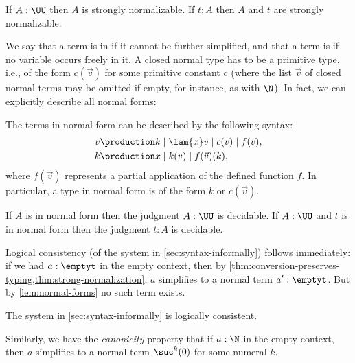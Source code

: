 \begin{thm}\label{thm:strong-normalization}
If $A : \UU$ then $A$ is strongly normalizable.
If $t:A$ then $A$ and $t$ are strongly normalizable.
\end{thm}

We say that a term is in 
%
%
if it cannot be further
simplified, and that a term is 
%
%
if no variable occurs freely in
it. A closed normal type has to be a primitive type, i.e., of the form
$c(\vec{v})$ for some primitive constant $c$ (where the list $\vec{v}$ of closed
normal terms may be omitted if empty, for instance, as with $\N$). In fact, we
can explicitly describe all normal forms:

\begin{lem}\label{lem:normal-forms}
  The terms in normal form can be described by the following syntax:
  \begin{align*}
    v & \production  k \mid \lam{x} v \mid c(\vec{v}) \mid f(\vec{v}), \\
    k &\production x \mid k(v) \mid f(\vec{v})(k),
  \end{align*}
  where $f(\vec{v})$ represents a partial application of the defined function $f$.
  In particular, a type in normal form is of the form $k$ or $c(\vec{v})$.
\end{lem}

\begin{thm}
  If $A$ is in normal form then the 
  judgment $A : \UU$ is decidable. If $A : \UU$ and $t$ is in normal form then the judgment
  $t:A$ is decidable.
\end{thm}

Logical consistency (of the system in \autoref{sec:syntax-informally}) follows
immediately: if we had $a:\emptyt$ in the empty context, then by
\autoref{thm:conversion-preserves-typing,thm:strong-normalization}, $a$
simplifies to a normal term $a':\emptyt$. But by
\autoref{lem:normal-forms} no such term exists.

\begin{cor}
 The system in \autoref{sec:syntax-informally} is logically consistent.
\end{cor}

Similarly, we have the \emph{canonicity} property that if $a:\N$ in the empty
context, then $a$ simplifies to a normal term $\suc^k(0)$ for some numeral $k$.

